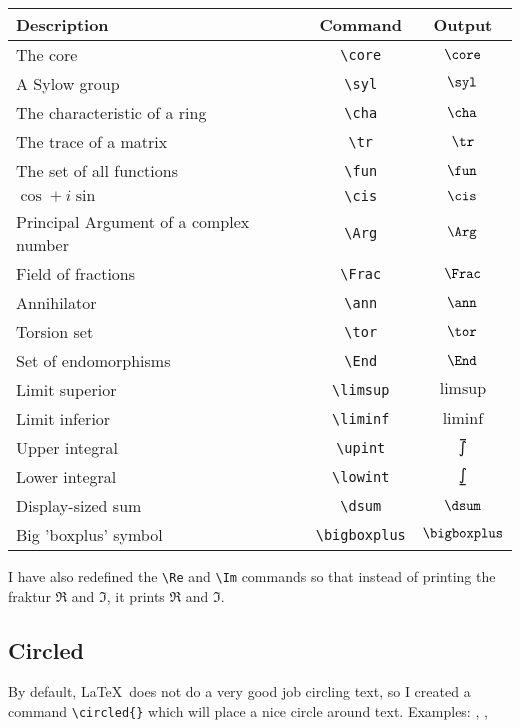 \documentclass[letterpaper,12pt]{article}
\begin{document}
		\begin{center}
		\begin{tabular}{| p{} | c | c |}
				\hline
				\textbf{Description} & \textbf{Command} & \textbf{Output} \\
				\hline \hline
		The core & \verb|\core| & $\core$ \\ \hline
		A Sylow group & \verb|\syl| & $\syl$ \\ \hline
		The characteristic of a ring & \verb|\cha| & $\cha$ \\ \hline
		The trace of a matrix & \verb|\tr| & $\tr$ \\ \hline
		The set of all functions & \verb|\fun| & $\fun$ \\ \hline
		$\cos + i\sin$ & \verb|\cis| & $\cis$ \\ \hline
		Principal Argument of a complex number & \verb|\Arg| & $\Arg$ \\ \hline
		Field of fractions & \verb|\Frac| & $\Frac$ \\ \hline
		Annihilator & \verb|\ann| & $\ann$ \\ \hline
		Torsion set & \verb|\tor| & $\tor$ \\ \hline
		Set of endomorphisms & \verb|\End| & $\End$ \\ \hline
		Limit superior & \verb|\limsup| & $\limsup$ \\ \hline
		Limit inferior & \verb|\liminf| & $\liminf$ \\ \hline
		Upper integral \rule{0pt}{15pt} & \verb|\upint| & $\upint$ \\ \hline
		Lower integral \rule{0pt}{15pt} & \verb|\lowint| & $\lowint$ \\ \hline
		Display-sized sum \rule{0pt}{15pt} & \verb|\dsum| & $\dsum$ \\ \hline
		Big 'boxplus' symbol & \verb|\bigboxplus| & $\bigboxplus$ \\ \hline
		
		\end{tabular}
		\end{center}
		
		I have also redefined the \verb|\Re| and \verb|\Im| commands so that instead of printing the fraktur $\mathfrak{R}$ and $\mathfrak{I}$, it prints $\Re$ and $\Im$.
		
		\subsection{Circled}
		\label{circled}
		By default, \LaTeX\ does not do a very good job circling text, so I 
		created a command \verb|\circled{}| which will place a nice 
		circle around text. Examples: , , 
		
\end{document}
